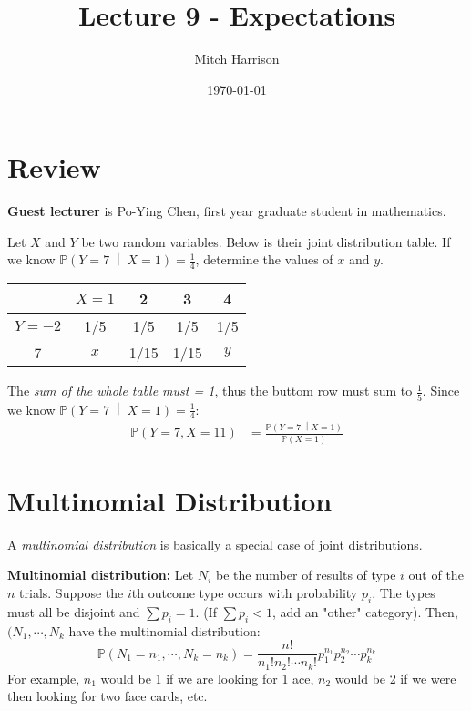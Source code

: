 \documentclass[titlepage, 12pt, leqno]{article}
\title{\Huge{Lecture 9 - Expectations}}
\author{\large{Mitch Harrison}}
\date{\today}
\begin{document}
\setlength{\parskip}{1\baselineskip}
\setlength{\parindent}{15pt}
\maketitle
\tableofcontents
\newpage


\section{Review}
\textbf{Guest lecturer} is Po-Ying Chen, first year graduate student in 
mathematics.

\begin{ex}
    Let $X$ and $Y$ be two random variables. Below is their joint distribution
    table. If we know $ \mathbb{P}\left(Y=7 \;\middle|\; X=1\right) =
    \frac{1}{4}$, determine the values of $x$ and $y$.
    \begin{center}
    \begin{tabular}{c|c c c c}
        &$X=1$&2&3&4\\
        \hline
        $Y=-2$ &1/5&1/5&1/5&1/5 \\
        7& $x$& 1/15&1/15& $y$
    \end{tabular}
    \end{center}

    The \textit{sum of the whole table must = 1}, thus the buttom row must sum to
    $\frac{1}{5}$. Since we know $ \mathbb{P}\left(Y=7 \;\middle|\; X=1
    \right) = \frac{1}{4}$:
   \begin{align*}
       \mathbb{P}(Y=7, X=11) &= \frac{ \mathbb{P}\left(Y=7 \;\middle| 
       X=1\right) }{\mathbb{P}(X=1)}
   \end{align*}
\end{ex}

\pagebreak
\section{Multinomial Distribution}
A \textit{multinomial distribution} is basically a special case of joint
distributions.
\begin{definition}
    \textbf{Multinomial distribution:}
    Let $N_i$ be the number of results of type $i$ out of the $n$ trials. Suppose
    the $i$th outcome type occurs with probability $p_i$. The types must all be 
    disjoint and $\sum p_i = 1$. (If $\sum p_i < 1$, add an "other" category).
    Then, $(N_1, \cdots ,N_k$ have the multinomial distribution:
    \[
    \mathbb{P}(N_1=n_1, \cdots , N_k = n_k) = \frac{n!}{n_1!n_2! \cdots n_k!} 
    p_1^{n_1}p_2^{n_2} \cdots p_k^{n_k}
    \]
    For example, $n_1$ would be 1 if we are looking for 1 ace, $n_2$ would be
    2 if we were then looking for two face cards, etc.
\end{definition}
\end{document}
